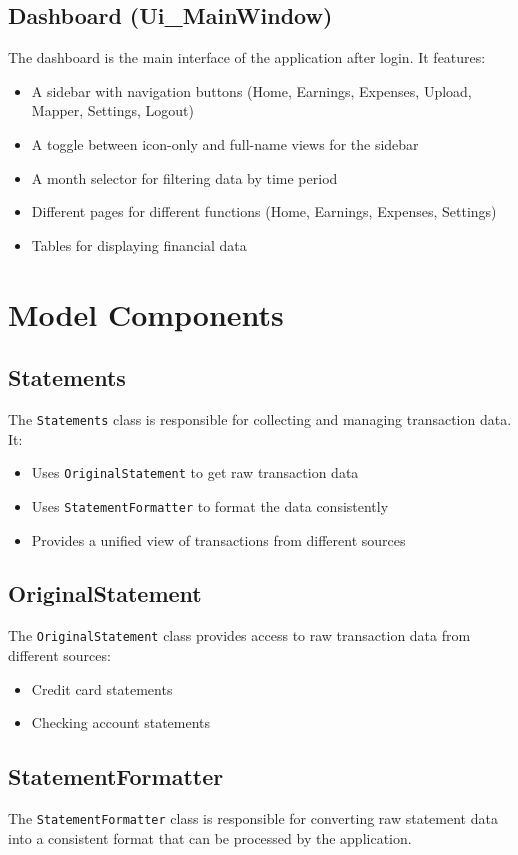 \documentclass[11pt,a4paper]{report}
\begin{document}
\subsection{Dashboard (Ui\_MainWindow)}
The dashboard is the main interface of the application after login. It features:
\begin{itemize}
    \item A sidebar with navigation buttons (Home, Earnings, Expenses, Upload, Mapper, Settings, Logout)
    \item A toggle between icon-only and full-name views for the sidebar
    \item A month selector for filtering data by time period
    \item Different pages for different functions (Home, Earnings, Expenses, Settings)
    \item Tables for displaying financial data
\end{itemize}

\section{Model Components}

\subsection{Statements}
The \texttt{Statements} class is responsible for collecting and managing transaction data. It:
\begin{itemize}
    \item Uses \texttt{OriginalStatement} to get raw transaction data
    \item Uses \texttt{StatementFormatter} to format the data consistently
    \item Provides a unified view of transactions from different sources
\end{itemize}

\subsection{OriginalStatement}
The \texttt{OriginalStatement} class provides access to raw transaction data from different sources:
\begin{itemize}
    \item Credit card statements
    \item Checking account statements
\end{itemize}

\subsection{StatementFormatter}
The \texttt{StatementFormatter} class is responsible for converting raw statement data into a consistent format that can be processed by the application.
\end{document}
